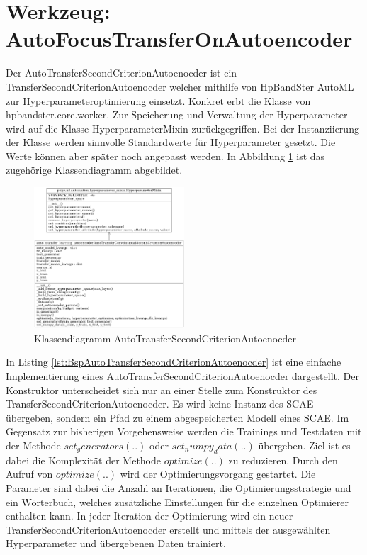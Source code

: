 	\section{Werkzeug: AutoFocusTransferOnAutoencoder}
	\label{sec:AutoTransferSecondCriterionAutoenocder}
	Der AutoTransferSecondCriterionAutoenocder ist ein TransferSecondCriterionAutoenocder welcher mithilfe von HpBandSter AutoML zur Hyperparameteroptimierung einsetzt. Konkret  erbt die Klasse von hpbandster.core.worker. Zur Speicherung und Verwaltung der Hyperparameter wird auf die Klasse HyperparameterMixin zurückgegriffen. Bei der Instanziierung der Klasse werden sinnvolle Standardwerte für Hyperparameter gesetzt. Die Werte können aber später noch angepasst werden. 
	In Abbildung \ref{img:KlassendiagrammAutoTransferSecondCriterionAutoenocder}  ist das zugehörige Klassendiagramm abgebildet. 
	\begin{figure}[h]
		\centering
		\includegraphics[width=0.5\textwidth, center]{bilder/Klassendiagramme/Klassendiagramm_AutoTLCSCAE.png}
		\caption[Klassendiagramm AutoTransferSecondCriterionAutoenocder]{Klassendiagramm AutoTransferSecondCriterionAutoenocder}
		\label{img:KlassendiagrammAutoTransferSecondCriterionAutoenocder}
	\end{figure}  
	In Listing \ref{lst:BspAutoTransferSecondCriterionAutoenocder} ist eine einfache Implementierung eines AutoTransferSecondCriterionAutoenocder dargestellt. Der Konstruktor unterscheidet sich nur an einer Stelle zum Konstruktor des TransferSecondCriterionAutoenocder. Es wird keine Instanz des SCAE übergeben, sondern ein Pfad zu einem abgespeicherten Modell eines SCAE. 
	Im Gegensatz zur bisherigen Vorgehensweise werden die Trainings und Testdaten mit der Methode $set_generators(..)$  oder $set_numpy_data(..)$ übergeben. Ziel ist es dabei die Komplexität der Methode $optimize(..)$ zu reduzieren. Durch den Aufruf von $optimize(..)$ wird der Optimierungsvorgang gestartet. Die Parameter sind dabei die Anzahl an Iterationen, die Optimierungsstrategie und ein Wörterbuch, welches zusätzliche Einstellungen für die einzelnen Optimierer enthalten kann. In jeder Iteration der Optimierung wird ein neuer TransferSecondCriterionAutoenocder erstellt und mittels der ausgewählten Hyperparameter und übergebenen Daten trainiert. 
